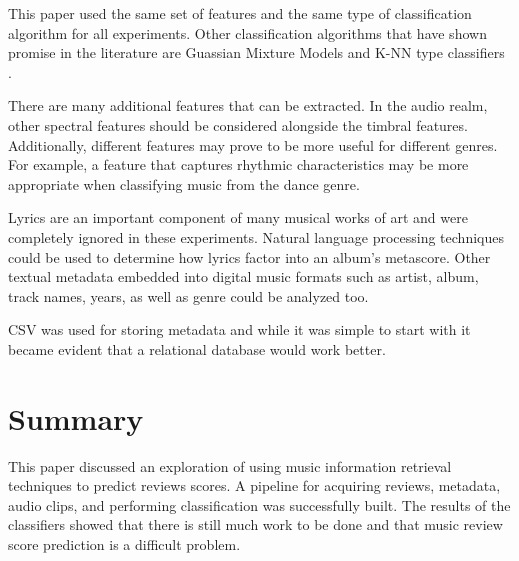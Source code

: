 \documentclass{acm_proc_article-sp}
\begin{document}
This paper used the 
same set of features and the same type of classification algorithm for
all experiments. Other classification algorithms that have shown promise in the
literature are Guassian Mixture Models and K-NN type classifiers \cite{Tzanetakis2000a}.

There are many additional features
that can be extracted. In the audio realm, other spectral features should
be considered alongside the timbral features. Additionally,
different features may prove to be more useful for different genres. For
example, a feature that captures rhythmic characteristics may be more
appropriate when classifying music from the dance genre.

Lyrics are an important 
component of many musical works of art and were completely ignored in these
experiments. Natural language processing techniques could be used to
determine how lyrics factor into an album's metascore.
Other textual metadata embedded into digital music formats such 
as artist, album, track names, years, as well as genre could be analyzed too.

CSV was used for storing metadata and while it was simple to start with
it became evident that a relational database would work better.

\section{Summary}
This paper discussed an exploration of using music information retrieval techniques
to predict reviews scores. A pipeline for acquiring reviews, metadata, audio clips,
and performing classification was successfully built. 
The results of the classifiers showed that there is still much work to be
done and that music review score prediction is a difficult problem.





\balancecolumns
\end{document}
